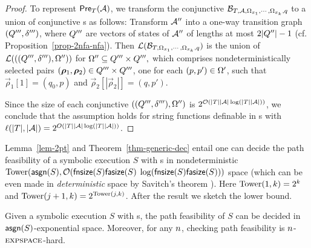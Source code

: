 \begin{proof}
To represent $\textsf{Pre}_{T}(\mathcal{A})$, we transform the conjunctive \FFA{} $\mathcal{B}_{T, \mathcal{A}, \Omega_{x_1}, \cdots, \Omega_{x_k},q}$ to a union of conjunctive \FA{}s as follows: Transform $\mathcal{A}''$ into a one-way transition graph $(Q''',\delta''')$, where $Q'''$ are vectors of states of $\mathcal{A}''$ of lengths at most $2|Q''|-1$ (cf. Proposition~\ref{prop-2nfa-nfa}). Then $\mathcal{L}(\mathcal{B}_{T, \Omega_{x_1}, \cdots, \Omega_{x_k},q})$ is the union of $\mathcal{L}(((Q''',\delta'''), \Omega''))$ for $\Omega'' \subseteq Q''' \times Q''',$ which comprises nondeterministically selected pairs $(\vec{\rho}_1, \vec{\rho}_2) \in \controls''' \times \controls'''$, one for each $(p, p') \in \Omega'$, such that $\vec{\rho}_1[1] =(q_0, p)$ and  $\vec{\rho}_2[|\vec{\rho}_2|] = (q, p')$.

Since the size of each conjunctive \FA{} $((Q''',\delta'''), \Omega'')$ is $ 2^{\mathcal{O}(|T||\mathcal{A}|\log (|T||\mathcal{A}|))}$, we conclude that 
the \prerec{} assumption holds for string functions definable in \PPT{}s with $\ell(|T|, |\mathcal{A}|) = 2^{O(|T||\mathcal{A}|\log (|T||\mathcal{A}|))}$.
\end{proof}

Lemma~\ref{lem-2pt} and Theorem~\ref{thm-generic-dec} entail %
one can decide the path feasibility of a symbolic execution $S$ with \PPT{}s in 
nondeterministic $\mathrm{Tower}(\mathsf{asgn}(S), \mathcal{O}(\mathsf{fnsize}(S) \mathsf{fasize}(S)$ 
$ \log(\mathsf{fnsize}(S) \mathsf{fasize}(S)))$ space (which can be even made in \emph{deterministic} space by Savitch's theorem \cite{Savitch70}). Here $\mathrm{Tower}(1, k)= 2^k$ and $\mathrm{Tower}(j+1, k) = 2^{\mathrm{Tower}(j, k)}$. 
After the result we sketch the lower bound.
%
\begin{theorem} \label{thm:two-way}
Given a symbolic execution $S$ with \PPT{}s, the path feasibility of $S$ can be decided in $\mathsf{asgn}(S)$-exponential space. Moreover,  for any $n$, checking path feasibility is
 $n$-$\textsc{expspace}$-hard.
\end{theorem}

